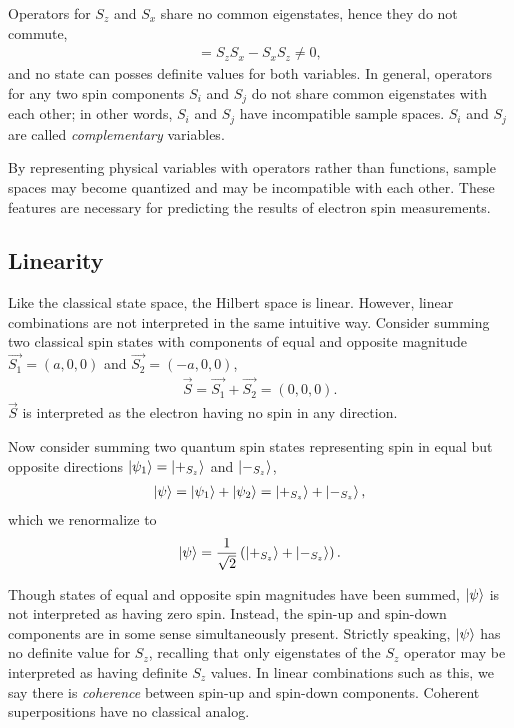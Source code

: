 Operators for $S_z$ and $S_x$ share no common eigenstates, hence they do not commute,
\begin{align}
  [S_z, S_x] = S_zS_x - S_xS_z \neq 0,
\end{align}
and no state can posses definite values for both variables. In general, operators for any two spin components $S_i$ and $S_j$ do not share common eigenstates with each other; in other words, $S_i$ and $S_j$ have incompatible sample spaces. $S_i$ and $S_j$ are called \textit{complementary} variables.



By representing physical variables with operators rather than functions, sample spaces may become quantized and may be incompatible with each other. These features are necessary for predicting the results of electron spin measurements.

\subsection{Linearity}
Like the classical state space, the Hilbert space is linear. However, linear combinations are not interpreted in the same intuitive way. Consider summing two classical spin states with components of equal and opposite magnitude $\vec{S_1} = (a, 0, 0)$ and $\vec{S_2} = (-a, 0, 0)$,
\begin{align}
  \vec{S} = \vec{S_1} + \vec{S_2} = (0, 0, 0).
\end{align}
$\vec{S}$ is interpreted as the electron having no spin in any direction.

Now consider summing two quantum spin states representing spin in equal but opposite directions $\ket{\psi_1} = \ket{+_{S_z}}$ and $\ket{-_{S_z}}$,
\begin{align}
  \ket{\psi} = \ket{\psi_1} + \ket{\psi_2} = \ket{+_{S_z}} + \ket{-_{S_z}},
\end{align}
which we renormalize to
\begin{align}
  \ket{\psi} = \frac{1}{\sqrt{2}} \left(\ket{+_{S_z}} + \ket{-_{S_z}} \right).
\end{align}

Though states of equal and opposite spin magnitudes have been summed, $\ket{\psi}$ is not interpreted as having zero spin. Instead, the spin-up and spin-down components are in some sense simultaneously present. Strictly speaking, $\ket{\psi}$ has no definite value for $S_z$, recalling that only eigenstates of the $S_z$ operator may be interpreted as having definite $S_z$ values. In linear combinations such as this, we say there is \textit{coherence} between spin-up and spin-down components. Coherent superpositions have no classical analog.

